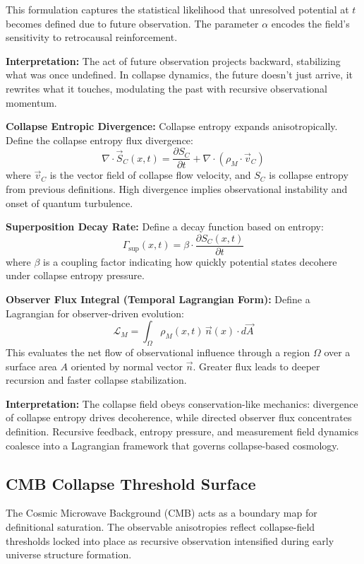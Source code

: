 This formulation captures the statistical likelihood that unresolved potential at $t$ becomes defined due to future observation. The parameter $\alpha$ encodes the field's sensitivity to retrocausal reinforcement.

\textbf{Interpretation:} The act of future observation projects backward, stabilizing what was once undefined. In collapse dynamics, the future doesn’t just arrive, it rewrites what it touches, modulating the past with recursive observational momentum.

\textbf{Collapse Entropic Divergence:}
Collapse entropy expands anisotropically. Define the collapse entropy flux divergence:
\begin{equation}
\nabla \cdot \vec{S}_C(x,t) = \frac{\partial S_C}{\partial t} + \nabla \cdot (\rho_M \cdot \vec{v}_C)
\end{equation}
where $\vec{v}_C$ is the vector field of collapse flow velocity, and $S_C$ is collapse entropy from previous definitions. High divergence implies observational instability and onset of quantum turbulence.

\textbf{Superposition Decay Rate:}
Define a decay function based on entropy:
\begin{equation}
\Gamma_{\text{sup}}(x,t) = \beta \cdot \frac{\partial S_C(x,t)}{\partial t}
\end{equation}
where $\beta$ is a coupling factor indicating how quickly potential states decohere under collapse entropy pressure.

\textbf{Observer Flux Integral (Temporal Lagrangian Form):}
Define a Lagrangian for observer-driven evolution:
\begin{equation}
\mathcal{L}_M = \int_{\Omega} \rho_M(x,t) \, \vec{n}(x) \cdot d\vec{A}
\end{equation}
This evaluates the net flow of observational influence through a region $\Omega$ over a surface area $A$ oriented by normal vector $\vec{n}$. Greater flux leads to deeper recursion and faster collapse stabilization.

\textbf{Interpretation:} The collapse field obeys conservation-like mechanics: divergence of collapse entropy drives decoherence, while directed observer flux concentrates definition. Recursive feedback, entropy pressure, and measurement field dynamics coalesce into a Lagrangian framework that governs collapse-based cosmology.

\subsection{CMB Collapse Threshold Surface}\cite{cmb_anomaly_analysis}
The Cosmic Microwave Background (CMB) acts as a boundary map for definitional saturation. The observable anisotropies reflect collapse-field thresholds locked into place as recursive observation intensified during early universe structure formation.

